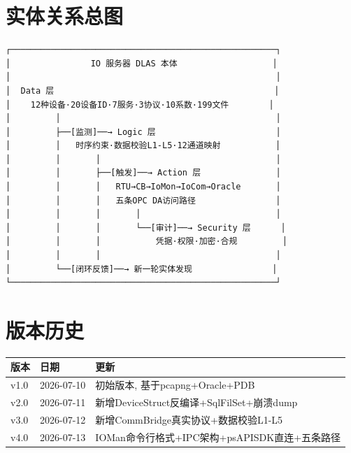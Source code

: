 \documentclass[12pt,a4paper]{ctexart}
\begin{document}
\section{实体关系总图}

\begin{verbatim}
┌─────────────────────────────────────────────────────┐
│                IO 服务器 DLAS 本体                   │
│                                                     │
│  Data 层                                            │
│    12种设备·20设备ID·7服务·3协议·10系数·199文件        │
│         │                                           │
│         ├──[监测]──→ Logic 层                        │
│         │   时序约束·数据校验L1-L5·12通道映射           │
│         │       │                                   │
│         │       ├──[触发]──→ Action 层               │
│         │       │   RTU→CB→IoMon→IoCom→Oracle       │
│         │       │   五条OPC DA访问路径                │
│         │       │       │                           │
│         │       │       └──[审计]──→ Security 层      │
│         │       │           凭据·权限·加密·合规         │
│         │       │                                   │
│         └──[闭环反馈]──→ 新一轮实体发现                │
└─────────────────────────────────────────────────────┘
\end{verbatim}

\section{版本历史}
\begin{table}[H]\centering
\begin{tabular}{lll}
\toprule
\textbf{版本} & \textbf{日期} & \textbf{更新} \\
\midrule
v1.0 & 2026-07-10 & 初始版本, 基于pcapng+Oracle+PDB \\
v2.0 & 2026-07-11 & 新增DeviceStruct反编译+SqlFilSet+崩溃dump \\
v3.0 & 2026-07-12 & 新增CommBridge真实协议+数据校验L1-L5 \\
v4.0 & 2026-07-13 & IOMan命令行格式+IPC架构+psAPISDK直连+五条路径 \\
\bottomrule
\end{tabular}
\end{table}
\end{document}
